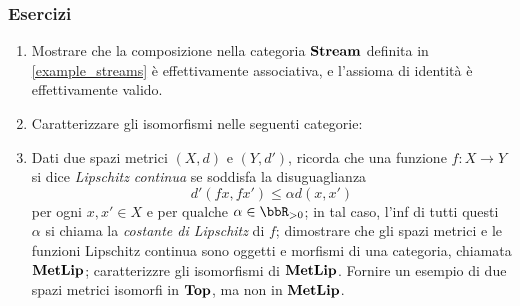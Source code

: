 \subsubsection*{Esercizi}
\begin{enumerate}
	\item Mostrare che la composizione nella categoria \(\mathbf{Stream}\) definita in \ref{example_streams} è effettivamente associativa, e l'assioma di identità è effettivamente valido. %
	\item Caratterizzare gli isomorfismi nelle seguenti categorie: 
	\item Dati due spazi metrici \((X,d)\) e \((Y,d')\), ricorda che una funzione \(f:X\to Y\) si dice \emph{Lipschitz continua} se soddisfa la disuguaglianza
	      \[
		      d'(fx,fx')\le \alpha d(x,x')
	      \]
	      per ogni \(x,x'\in X\) e per qualche \(\alpha\in\bbR_{>0}\); in tal caso, l'inf di tutti questi \(\alpha\) si chiama la \emph{costante di Lipschitz} di \(f\); dimostrare che gli spazi metrici e le funzioni Lipschitz continua sono oggetti e morfismi di una categoria, chiamata \(\mathbf{MetLip}\); caratterizzre gli isomorfismi di \(\mathbf{MetLip}\). Fornire un esempio di due spazi metrici isomorfi in \(\mathbf{Top}\), ma non in \(\mathbf{MetLip}\).


\end{enumerate}
